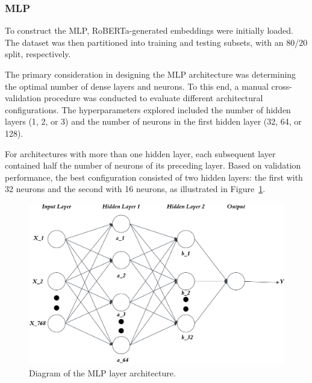 \subsubsection{MLP}

To construct the MLP, RoBERTa-generated embeddings were initially loaded. The dataset was then partitioned into training and testing subsets, with an 80/20 split, respectively.

The primary consideration in designing the MLP architecture was determining the optimal number of dense layers and neurons. To this end, a manual cross-validation procedure was conducted to evaluate different architectural configurations. The hyperparameters explored included the number of hidden layers (1, 2, or 3) and the number of neurons in the first hidden layer (32, 64, or 128).

For architectures with more than one hidden layer, each subsequent layer contained half the number of neurons of its preceding layer. Based on validation performance, the best configuration consisted of two hidden layers: the first with 32 neurons and the second with 16 neurons, as illustrated in Figure~\ref{fig:mpl_layer_diagram}.


\begin{figure}[htbp]
    \centering
    \includegraphics[width=0.8\linewidth]{images/MPL_layer_diagram.png}
    \caption{Diagram of the MLP layer architecture.}
    \label{fig:mpl_layer_diagram}
\end{figure}
